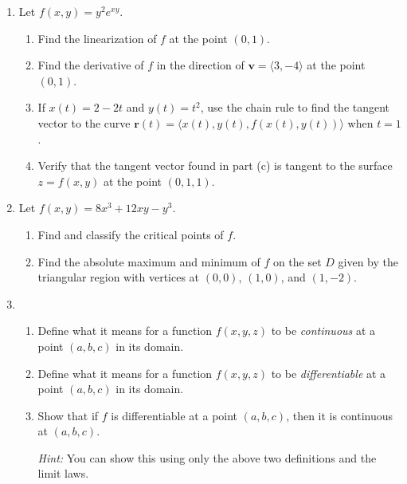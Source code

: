 \documentclass[12pt]{article}
\newcommand{\points}[1]{\marginpar{\hspace{24pt}[#1]}}
\begin{document}
\begin{enumerate}
\item Let $f(x,y) = y^2e^{xy}$.
\begin{enumerate}
\item Find the linearization of $f$ at the point $(0,1)$. \points{4}

\vspace{1.6in}


\item Find the derivative of $f$ in the direction of $\mathbf{v} = \langle 3,-4\rangle$ at the point $(0,1)$. \points{3}

\vspace{1.5in}

\item If $x(t)=2-2t$ and $y(t) = t^2$, use the chain rule to find the tangent vector to the curve $\mathbf{r}(t) = \langle x(t),y(t),f(x(t),y(t))\rangle$ when $t=1$. \points{5}

\vspace{2.3in}

\item Verify that the tangent vector found in part (c) is tangent to the surface $z=f(x,y)$ at the point $(0,1,1)$. \points{3}
\end{enumerate}
\newpage

\item Let $f(x,y) = 8x^3+12xy-y^3$.
\begin{enumerate}
\item Find and classify the critical points of $f$. \points{8}

\vspace{4in}

\item Find the absolute maximum and minimum of $f$ on the set $D$ given by the triangular region with vertices at $(0,0)$, $(1,0)$, and $(1,-2)$. \points{7}
\end{enumerate}
\newpage

\item \begin{enumerate}
\item Define what it means for a function $f(x,y,z)$ to be {\em continuous} at a point $(a,b,c)$ in its domain. \points{2}

\vspace{1.5in}

\item Define what it means for a function $f(x,y,z)$ to be {\em differentiable} at a point $(a,b,c)$ in its domain. \points{3}

\vspace{2in}

\item Show that if $f$ is differentiable at a point $(a,b,c)$, then it is continuous at $(a,b,c)$.\points{5}

{\em Hint:} You can show this using only the above two definitions and the limit laws.
\end{enumerate}
\end{enumerate}
\newpage
\end{document}
